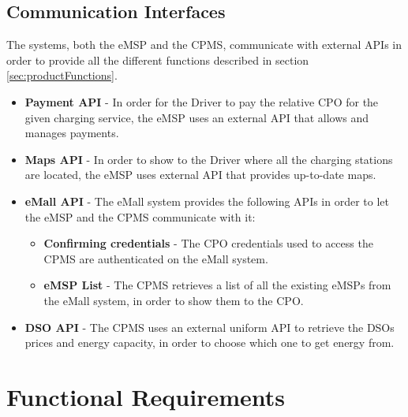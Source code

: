 \subsection{Communication Interfaces}
\label{subsec:communicationInterfaces}
The systems, both the eMSP and the CPMS, communicate with external APIs in order to provide all the different functions described in section \ref{sec:productFunctions}.
\begin{itemize}
    \item \textbf{Payment API} - In order for the Driver to pay the relative CPO for the given charging service, the eMSP uses an external API that allows and manages payments.
    \item \textbf{Maps API} - In order to show to the Driver where all the charging stations are located, the eMSP uses external API that provides up-to-date maps.
    \item \textbf{eMall API} - The eMall system provides the following APIs in order to let the eMSP and the CPMS communicate with it:
        \begin{itemize}
            \item \textbf{Confirming credentials} - The CPO credentials used to access the CPMS are authenticated on the eMall system.
            \item \textbf{eMSP List} - The CPMS retrieves a list of all the existing eMSPs from the eMall system, in order to show them to the CPO.
        \end{itemize}
   \item \textbf{DSO API} - The CPMS uses an external uniform API to retrieve the DSOs prices and energy capacity, in order to choose which one to get energy from. 
\end{itemize}
\label{subsec:sequenceDiagrams}
\section{Functional Requirements}
\label{sec:functionalRequirements}

